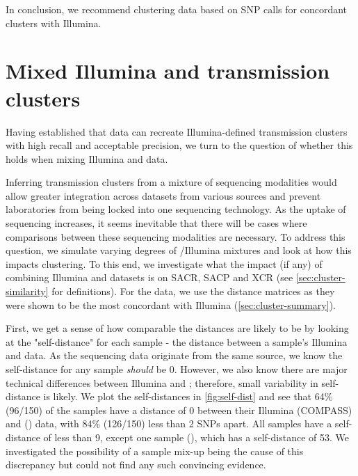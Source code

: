 \noindent
In conclusion, we recommend clustering \ont{} data based on \bcftools{} SNP calls for concordant clusters with Illumina.


\section{Mixed Illumina and \ont{} transmission clusters}
\label{sec:mixed-clustering}

Having established that \ont{} data can recreate Illumina-defined transmission clusters with high recall and acceptable precision, we turn to the question of whether this holds when mixing Illumina and \ont{} data. 

Inferring transmission clusters from a mixture of sequencing modalities would allow greater integration across datasets from various sources and prevent laboratories from being locked into one sequencing technology. As the uptake of \ont{} sequencing increases, it seems inevitable that there will be cases where comparisons between these sequencing modalities are necessary. To address this question, we simulate varying degrees of \ont{}/Illumina mixtures and look at how this impacts clustering. To this end, we investigate what the impact (if any) of combining Illumina and \ont{} datasets is on SACR, SACP and XCR (see \autoref{sec:cluster-similarity} for definitions). For the \ont{} data, we use the \bcftools{} distance matrices as they were shown to be the most concordant with Illumina (\autoref{sec:cluster-summary}).

First, we get a sense of how comparable the distances are likely to be by looking at the "self-distance" for each sample - the distance between a sample's Illumina and \ont{} data.  As the sequencing data originate from the same source, we know the self-distance for any sample \emph{should} be 0. However, we also know there are major technical differences between Illumina and \ont{}; therefore, small variability in self-distance is likely. We plot the self-distances in \autoref{fig:self-dist} and see that 64\% (96/150) of the samples have a distance of 0 between their Illumina (COMPASS) and \ont{} (\bcftools{}) data, with 84\% (126/150) less than 2 SNPs apart. All samples have a self-distance of less than 9, except one sample (), which has a self-distance of 53. We investigated the possibility of a sample mix-up being the cause of this discrepancy but could not find any such convincing evidence. 

